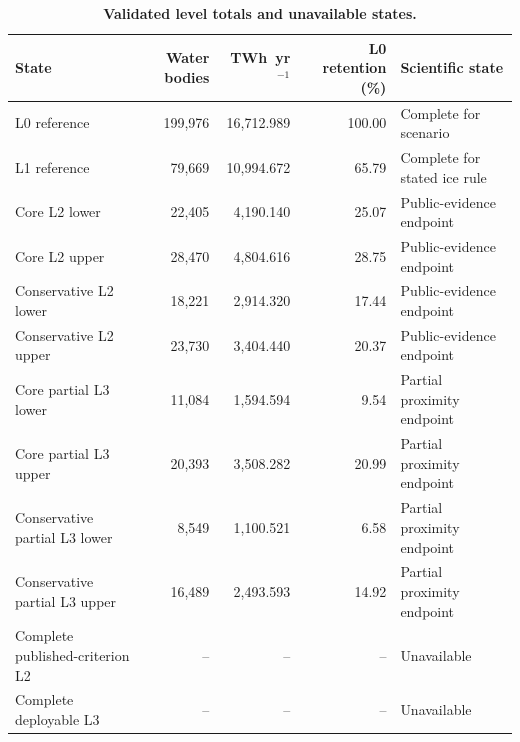 \begin{table}[H]
\centering
\caption{\textbf{Validated level totals and unavailable states.}}
\label{tab:S4}
\scriptsize
\begin{tabular}{lrrrl}
\toprule
State & Water bodies & TWh~yr$^{-1}$ & L0 retention (\%) & Scientific state \\
\midrule
L0 reference & 199{,}976 & 16{,}712.989 & 100.00 & Complete for scenario \\
L1 reference & 79{,}669 & 10{,}994.672 & 65.79 & Complete for stated ice rule \\
Core L2 lower & 22{,}405 & 4{,}190.140 & 25.07 & Public-evidence endpoint \\
Core L2 upper & 28{,}470 & 4{,}804.616 & 28.75 & Public-evidence endpoint \\
Conservative L2 lower & 18{,}221 & 2{,}914.320 & 17.44 & Public-evidence endpoint \\
Conservative L2 upper & 23{,}730 & 3{,}404.440 & 20.37 & Public-evidence endpoint \\
Core partial L3 lower & 11{,}084 & 1{,}594.594 & 9.54 & Partial proximity endpoint \\
Core partial L3 upper & 20{,}393 & 3{,}508.282 & 20.99 & Partial proximity endpoint \\
Conservative partial L3 lower & 8{,}549 & 1{,}100.521 & 6.58 & Partial proximity endpoint \\
Conservative partial L3 upper & 16{,}489 & 2{,}493.593 & 14.92 & Partial proximity endpoint \\
Complete published-criterion L2 & -- & -- & -- & Unavailable \\
Complete deployable L3 & -- & -- & -- & Unavailable \\
\bottomrule
\end{tabular}
\end{table}

